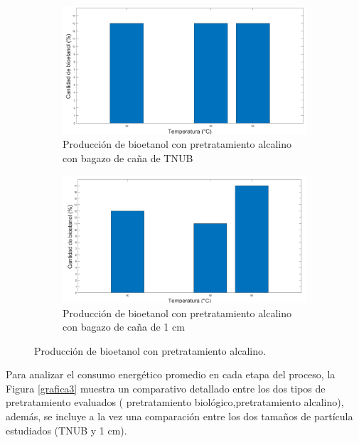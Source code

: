 \documentclass[12pt]{article}
\begin{document}
		
				\begin{figure}[h]
				\centering
				\begin{subfigure}[b]{0.49\textwidth}
					\includegraphics[width=\linewidth]{imagenes/alcalino_TNUB}
					\caption{Producción de bioetanol con pretratamiento alcalino con bagazo de caña  de TNUB}
					\label{bipoo}
				\end{subfigure}
				\hfill %
				\begin{subfigure}[b]{0.49\textwidth}
					\includegraphics[width=\linewidth]{imagenes/alcalino_1cm}
					\caption{Producción de bioetanol con pretratamiento alcalino con bagazo de caña de 1 cm}
					\label{fig:imagen11}
				\end{subfigure}
				\caption{Producción de bioetanol con pretratamiento alcalino.}
				\label{producción}
			\end{figure}
			
Para analizar el consumo energético promedio en cada etapa del proceso, la Figura \ref{grafica3} muestra un comparativo detallado entre los dos tipos de pretratamiento evaluados ( pretratamiento biológico,pretratamiento alcalino), además, se incluye a la vez una comparación entre los dos tamaños de partícula estudiados (TNUB y 1 cm).
			
\end{document}
